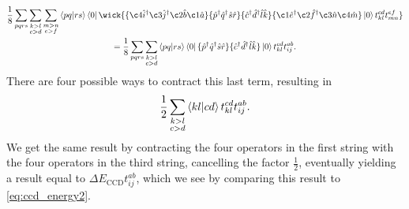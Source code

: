 \begin{equation}
    \begin{gathered}
    \frac{1}{8}\sum_{pqrs}\sum_{\substack{k>l \\ c>d}} \sum_{\substack{m>n \\ e>f}}
    \bra{pq} \ket{rs} \bra{0}
      \wick{ 
            \{\c4{\hat{i}}^\dagger \c3{\hat{j}}^\dagger \c2{\hat{b}} \c1{\hat{a}} \}
            \{\hat{p}^\dagger \hat{q}^\dagger \hat{s} \hat{r} \}
            \{\hat{c}^\dagger \hat{d}^\dagger \hat{l} \hat{k} \}
            \{\c1{\hat{e}}^\dagger \c2{\hat{f}}^\dagger \c3{\hat{n}} \c4{\hat{m}} \}
        \ket{0} t^{cd}_{kl} t^{ef}_{mn}
        } \\
    =
    \frac{1}{8}\sum_{pqrs}\sum_{\substack{k>l \\ c>d}}
    \bra{pq} \ket{rs} \bra{0}
        \{\hat{p}^\dagger \hat{q}^\dagger \hat{s} \hat{r} \}
        \{\hat{c}^\dagger \hat{d}^\dagger \hat{l} \hat{k} \}
    \ket{0} t^{cd}_{kl} t^{ab}_{ij}.
    \end{gathered}
\end{equation}
There are four possible ways to contract this last term, resulting in
\begin{equation}
    \frac{1}{2}\sum_{\substack {k>l \\ c >d }}
        \bra{kl} \ket{cd} t^{cd}_{kl} t^{ab}_{ij}.
\end{equation}
We get the same result by contracting the four operators in the first 
string with the four operators in the third string, cancelling the
factor $\frac{1}{2}$, eventually yielding a result equal to
$\Delta E_{\text{CCD}} t^{ab}_{ij}$, which we see by 
comparing this result to \autoref{eq:ccd_energy2}.

